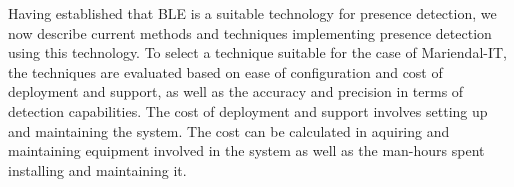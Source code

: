 Having established that BLE is a suitable technology for presence detection, we now describe current methods and techniques implementing presence detection using this technology.
To select a technique suitable for the case of Mariendal-IT, the techniques are evaluated based on ease of configuration and cost of deployment and support, as well as the accuracy and precision in terms of detection capabilities.
The cost of deployment and support involves setting up and maintaining the system. 
The cost can be calculated in aquiring and maintaining equipment involved in the system as well as the man-hours spent installing and maintaining it. 